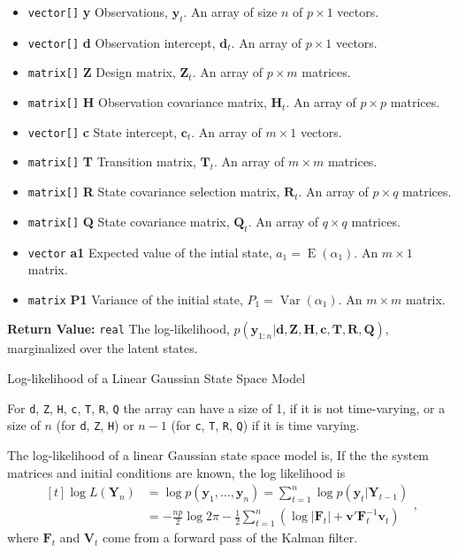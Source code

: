 \documentclass[]{book}
\providecommand{\tightlist}{%
  \setlength{\itemsep}{0pt}\setlength{\parskip}{0pt}}
\DeclareMathOperator{\E}{E}
\DeclareMathOperator{\Var}{Var}
\newcommand{\mat}[1]{\boldsymbol{#1}}
\renewcommand{\vec}[1]{\boldsymbol{#1}}
\renewcommand{\T}{'}
\begin{document}
\begin{itemize}
\tightlist
\item
  \texttt{vector{[}{]}} \textbf{y} Observations, \(\vec{y}_t\). An array
  of size \(n\) of \(p \times 1\) vectors.
\item
  \texttt{vector{[}{]}} \textbf{d} Observation intercept, \(\vec{d}_t\).
  An array of \(p \times 1\) vectors.
\item
  \texttt{matrix{[}{]}} \textbf{Z} Design matrix, \(\mat{Z}_t\). An
  array of \(p \times m\) matrices.
\item
  \texttt{matrix{[}{]}} \textbf{H} Observation covariance matrix,
  \(\mat{H}_t\). An array of \(p \times p\) matrices.
\item
  \texttt{vector{[}{]}} \textbf{c} State intercept, \(\vec{c}_t\). An
  array of \(m \times 1\) vectors.
\item
  \texttt{matrix{[}{]}} \textbf{T} Transition matrix, \(\mat{T}_t\). An
  array of \(m \times m\) matrices.
\item
  \texttt{matrix{[}{]}} \textbf{R} State covariance selection matrix,
  \(\mat{R} _t\). An array of \(p \times q\) matrices.
\item
  \texttt{matrix{[}{]}} \textbf{Q} State covariance matrix,
  \(\mat{Q}_t\). An array of \(q \times q\) matrices.
\item
  \texttt{vector} \textbf{a1} Expected value of the intial state,
  \(a_1 = \E(\alpha_1)\). An \(m \times 1\) matrix.
\item
  \texttt{matrix} \textbf{P1} Variance of the initial state,
  \(P_1 = \Var(\alpha_1)\). An \(m \times m\) matrix.
\end{itemize}

\textbf{Return Value:} \texttt{real} The log-likelihood,
\(p(\vec{y}_{1:n} | \vec{d}, \mat{Z}, \mat{H}, \vec{c}, \mat{T}, \mat{R}, \mat{Q})\),
marginalized over the latent states.

Log-likelihood of a Linear Gaussian State Space Model

For \texttt{d}, \texttt{Z}, \texttt{H}, \texttt{c}, \texttt{T},
\texttt{R}, \texttt{Q} the array can have a size of 1, if it is not
time-varying, or a size of \(n\) (for \texttt{d}, \texttt{Z},
\texttt{H}) or \(n - 1\) (for \texttt{c}, \texttt{T}, \texttt{R},
\texttt{Q}) if it is time varying.

The log-likelihood of a linear Gaussian state space model is, If the the
system matrices and initial conditions are known, the log likelihood is
\[
\begin{aligned}[t]
\log L(\mat{Y}_n) &= \log p(\vec{y}_1, \dots, \vec{y}_n) = \sum_{t = 1}^n \log p(\vec{y}_t | \mat{Y}_{t - 1}) \\
&= - \frac{np}{2} \log 2 \pi - \frac{1}{2} \sum_{t = 1}^n \left( \log \left| \mat{F}_t \right| + \vec{v}\T \mat{F}_t^{-1} \vec{v}_t \right)
\end{aligned} ,
\] where \(\mat{F}_t\) and \(\mat{V}_t\) come from a forward pass of the
Kalman filter.
\end{document}
